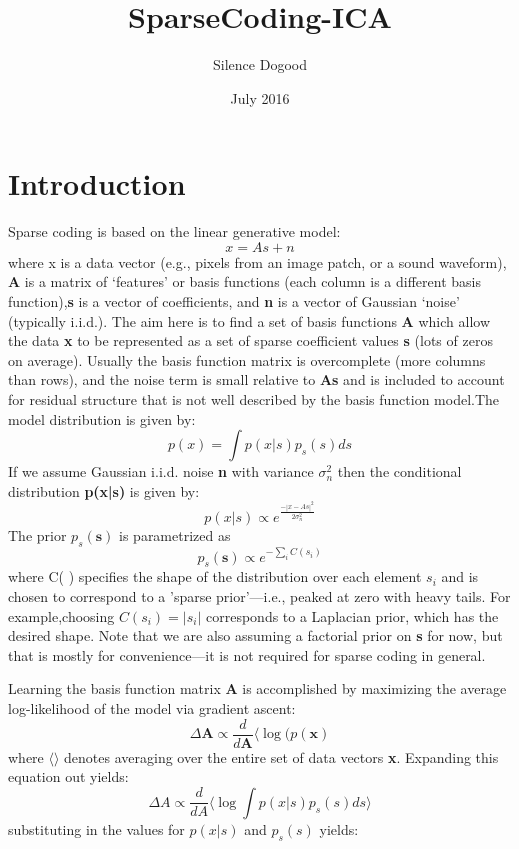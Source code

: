 \documentclass{article}
\title{SparseCoding-ICA}
\author{Silence Dogood }
\date{July 2016}
\begin{document}
\maketitle

\section{Introduction}
Sparse coding is based on the linear generative model:
\begin{equation}
    x = As + n
\end{equation}
where x is a data vector (e.g., pixels from an image patch, or a sound waveform), \textbf{A} is a matrix of ‘features’ or basis functions (each column is a different basis function),\textbf{s} is a vector of coefficients, and \textbf{n} is a vector of Gaussian ‘noise’ (typically i.i.d.). The aim here is to find a set of basis functions \textbf{A} which allow the data \textbf{x} to be represented as a set of sparse coefficient values \textbf{s} (lots of zeros on average). Usually the basis function matrix is overcomplete (more columns than rows), and the noise term is small relative to \textbf{As} and is included to account for residual structure that is not well described by the basis function model.The model distribution is given by:
\begin{equation}
    p(x) = \int{p(x|s)p_s(s) ds}
\end{equation}
If we assume Gaussian i.i.d. noise \textbf{n} with variance \textbf{$\sigma_n^2$} then the conditional distribution \textbf{p(x|s)} is given by:
\begin{equation}
    p(x|s) \propto e^{\frac{-|x - As|^2}{2\sigma_n^2}}
\end{equation}
The prior $p_s(\textbf{s})$ is parametrized as
\begin{equation}
    p_s(\textbf{s}) \propto e^{-\sum_i C(s_i)}
\end{equation}
where C( ) specifies the shape of the distribution over each element $s_i$ and is chosen to correspond to a 'sparse prior’—i.e., peaked at zero with heavy tails. For example,choosing $C(s_i) =|s_i|$ corresponds to a Laplacian prior, which has the desired shape. Note that we are also assuming a factorial prior on \textbf{s} for now, but that is mostly for convenience—it is not required for sparse coding in general.
\par Learning the basis function matrix \textbf{A} is accomplished by maximizing the average log-likelihood of the model via gradient ascent:
\begin{equation}
    \Delta\textbf{A} \propto \frac{d}{d\textbf{A}}\langle \log(p(\textbf{x})
\end{equation}
where $\langle\rangle$ denotes averaging over the entire set of data vectors \textbf{x}. Expanding this equation out yields:
\begin{equation}
    \Delta A \propto \frac{d}{dA} \langle \log\int p(x|s)p_s(s) ds \rangle
\end{equation}
substituting in the values for $p(x|s)$ and $p_s(s)$ yields:
\end{document}

